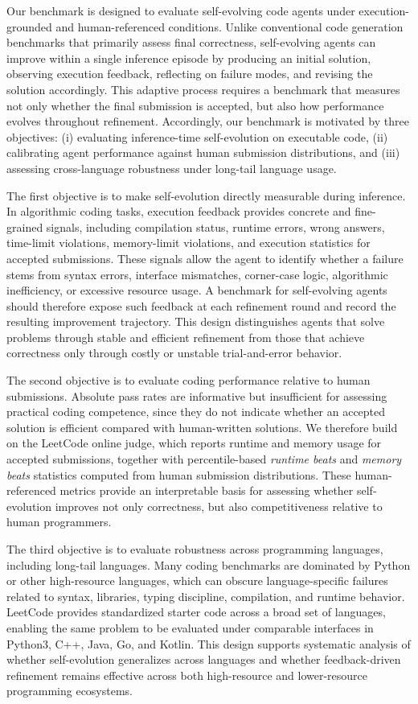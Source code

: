 Our benchmark is designed to evaluate self-evolving code agents under execution-grounded and human-referenced conditions. Unlike conventional code generation benchmarks that primarily assess final correctness, self-evolving agents can improve within a single inference episode by producing an initial solution, observing execution feedback, reflecting on failure modes, and revising the solution accordingly. This adaptive process requires a benchmark that measures not only whether the final submission is accepted, but also how performance evolves throughout refinement. Accordingly, our benchmark is motivated by three objectives: (i) evaluating inference-time self-evolution on executable code, (ii) calibrating agent performance against human submission distributions, and (iii) assessing cross-language robustness under long-tail language usage.

The first objective is to make self-evolution directly measurable during inference. In algorithmic coding tasks, execution feedback provides concrete and fine-grained signals, including compilation status, runtime errors, wrong answers, time-limit violations, memory-limit violations, and execution statistics for accepted submissions. These signals allow the agent to identify whether a failure stems from syntax errors, interface mismatches, corner-case logic, algorithmic inefficiency, or excessive resource usage. A benchmark for self-evolving agents should therefore expose such feedback at each refinement round and record the resulting improvement trajectory. This design distinguishes agents that solve problems through stable and efficient refinement from those that achieve correctness only through costly or unstable trial-and-error behavior.

The second objective is to evaluate coding performance relative to human submissions. Absolute pass rates are informative but insufficient for assessing practical coding competence, since they do not indicate whether an accepted solution is efficient compared with human-written solutions. We therefore build on the LeetCode online judge, which reports runtime and memory usage for accepted submissions, together with percentile-based \emph{runtime beats} and \emph{memory beats} statistics computed from human submission distributions. These human-referenced metrics provide an interpretable basis for assessing whether self-evolution improves not only correctness, but also competitiveness relative to human programmers.

The third objective is to evaluate robustness across programming languages, including long-tail languages. Many coding benchmarks are dominated by Python or other high-resource languages, which can obscure language-specific failures related to syntax, libraries, typing discipline, compilation, and runtime behavior. LeetCode provides standardized starter code across a broad set of languages, enabling the same problem to be evaluated under comparable interfaces in Python3, C++, Java, Go, and Kotlin. This design supports systematic analysis of whether self-evolution generalizes across languages and whether feedback-driven refinement remains effective across both high-resource and lower-resource programming ecosystems.

